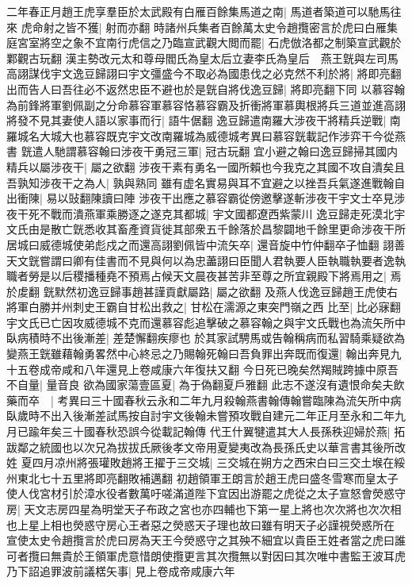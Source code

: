二年春正月趙王虎享羣臣於太武殿有白雁百餘集馬道之南|{
	馬道者築道可以馳馬往來}
虎命射之皆不獲|{
	射而亦翻}
時諸州兵集者百餘萬太史令趙攬密言於虎曰白雁集庭宮室將空之象不宜南行虎信之乃臨宣武觀大閲而罷|{
	石虎倣洛都之制築宣武觀於鄴觀古玩翻}
漢主勢改元太和尊母閻氏為皇太后立妻李氏為皇后　燕王皝與左司馬高詡謀伐宇文逸豆歸詡曰宇文彊盛今不取必為國患伐之必克然不利於將|{
	將即亮翻}
出而告人曰吾往必不返然忠臣不避也於是皝自將伐逸豆歸|{
	將即亮翻下同}
以慕容翰為前鋒將軍劉佩副之分命慕容軍慕容恪慕容霸及折衝將軍慕輿根將兵三道並進高詡將發不見其妻使人語以家事而行|{
	語牛倨翻}
逸豆歸遣南羅大涉夜干將精兵逆戰|{
	南羅城名大城大也慕容既克宇文改南羅城為威德城考異曰慕容皝載記作涉弈干今從燕書}
皝遣人馳謂慕容翰曰涉夜干勇冠三軍|{
	冠古玩翻}
宜小避之翰曰逸豆歸掃其國内精兵以屬涉夜干|{
	屬之欲翻}
涉夜干素有勇名一國所賴也今我克之其國不攻自潰矣且吾孰知涉夜干之為人|{
	孰與熟同}
雖有虚名實易與耳不宜避之以挫吾兵氣遂進戰翰自出衝陳|{
	易以䜴翻陳讀曰陣}
涉夜干出應之慕容霸從傍邀擊遂斬涉夜干宇文士卒見涉夜干死不戰而潰燕軍乘勝逐之遂克其都城|{
	宇文國都遼西紫蒙川}
逸豆歸走死漠北宇文氏由是散亡皝悉收其畜產資貨徙其部衆五千餘落於昌黎闢地千餘里更命涉夜干所居城曰威德城使弟彪戍之而還高詡劉佩皆中流矢卒|{
	還音旋中竹仲翻卒子恤翻}
詡善天文皝嘗謂曰卿有佳書而不見與何以為忠藎詡曰臣聞人君執要人臣執職執要者逸執職者勞是以后稷播種堯不預焉占候天文晨夜甚苦非至尊之所宜親殿下將焉用之|{
	焉於䖍翻}
皝默然初逸豆歸事趙甚謹貢獻屬路|{
	屬之欲翻}
及燕人伐逸豆歸趙王虎使右將軍白勝并州刺史王霸自甘松出救之|{
	甘松在濡源之東突門嶺之西}
比至|{
	比必寐翻}
宇文氏已亡因攻威德城不克而還慕容彪追擊破之慕容翰之與宇文氏戰也為流矢所中臥病積時不出後漸差|{
	差楚懈翻疾瘳也}
於其家試騁馬或告翰稱病而私習騎乘疑欲為變燕王皝雖藉翰勇畧然中心終忌之乃賜翰死翰曰吾負罪出奔既而復還|{
	翰出奔見九十五卷成帝咸和八年還見上卷咸康六年復扶又翻}
今日死已晚矣然羯賊跨據中原吾不自量|{
	量音良}
欲為國家蕩壹區夏|{
	為于偽翻夏戶雅翻}
此志不遂沒有遺恨命矣夫飲藥而卒　|{
	考異曰三十國春秋云永和二年九月殺翰燕書翰傳翰嘗臨陳為流矢所中病臥歲時不出入後漸差試馬按自討宇文後翰未嘗預攻戰自建元二年正月至永和二年九月已踰年矣三十國春秋恐誤今從載記翰傳}
代王什翼犍遣其大人長孫秩迎婦於燕|{
	拓跋鄰之統國也以次兄為拔拔氏厥後孝文帝用夏變夷改為長孫氏史以華言書其後所改姓}
夏四月凉州將張瓘敗趙將王擢于三交城|{
	三交城在朔方之西宋白曰三交土堠在綏州東北七十五里將即亮翻敗補邁翻}
初趙領軍王朗言於趙王虎曰盛冬雪寒而皇太子使人伐宮材引於漳水役者數萬吁嗟滿道陛下宜因出游罷之虎從之太子宣怒會熒惑守房|{
	天文志房四星為明堂天子布政之宮也亦四輔也下第一星上將也次次將也次次相也上星上相也熒惑守房心王者惡之熒惑天子理也故曰雖有明天子必謹視熒惑所在}
宣使太史令趙攬言於虎曰房為天王今熒惑守之其殃不細宜以貴臣王姓者當之虎曰誰可者攬曰無貴於王領軍虎意惜朗使攬更言其次攬無以對因曰其次唯中書監王波耳虎乃下詔追罪波前議楛矢事|{
	見上卷成帝咸康六年}
